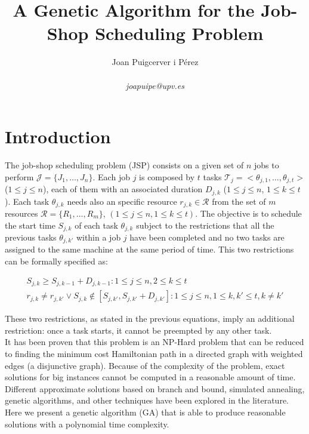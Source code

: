 \documentclass[10pt,a4paper]{article}
\author{Joan Puigcerver i Pérez\\
\begin{footnotesize}
\textit{joapuipe@upv.es}
\end{footnotesize}}
\title{A Genetic Algorithm for the Job-Shop Scheduling Problem}
\begin{document}
\maketitle
\section{Introduction}
The job-shop scheduling problem (JSP) consists on a given set of $n$ jobs to perform $\mathcal{J} = \{J_1, \ldots, J_n\}$. Each job $j$ is composed by $t$ tasks $\mathcal{T}_j = <\theta_{j,1}, \ldots, \theta_{j,t}>$ ($1 \leq j \leq n$), each of them with an associated duration $D_{j,k}$ ($1 \leq j \leq n$, $1 \leq k \leq t$). Each task $\theta_{j,k}$ needs also an specific resource $r_{j,k} \in \mathcal{R}$ from the set of $m$ resources $\mathcal{R} = \{R_1, \ldots, R_m\}$, $(1 \leq j \leq n, 1 \leq k \leq t)$. The objective is to schedule the start time $S_{j,k}$ of each task $\theta_{j,k}$ subject to the restrictions that all the previous tasks $\theta_{j,k'}$ within a job $j$ have been completed and no two tasks are assigned to the same machine at the same period of time. This two restrictions can be formally specified as:

\begin{eqnarray}
S_{j,k} \geq S_{j,k-1} + D_{j,k-1} : 1 \leq j \leq n, 2 \leq k \leq t \label{eq:consecutive_tasks} \\
r_{j,k} \neq r_{j,k'} \vee S_{j,k} \notin  [S_{j,k'}, S_{j,k'} + D_{j,k'}] : 1 \leq j \leq n, 1 \leq k,k' \leq t, k \neq k' \label{eq:single_core_machines}
\end{eqnarray}

These two restrictions, as stated in the previous equations, imply an additional restriction: once a task starts, it cannot be preempted by any other task.\\

It has been proven that this problem is an NP-Hard problem that can be reduced to finding the minimum cost Hamiltonian path in a directed graph with weighted edges (a disjunctive graph)\cite{lenstra1977complexity,lenstra1979computational,blazewicz2000disjunctive}. Because of the complexity of the problem, exact solutions for big instances cannot be computed in a reasonable amount of time. Different approximate solutions based on branch and bound\cite{carlier1989algorithm}, simulated annealing\cite{van1992job}, genetic algorithms\cite{davis1985job}, and other techniques have been explored in the literature. Here we present a genetic algorithm (GA) that is able to produce reasonable solutions with a polynomial time complexity.
\end{document}
